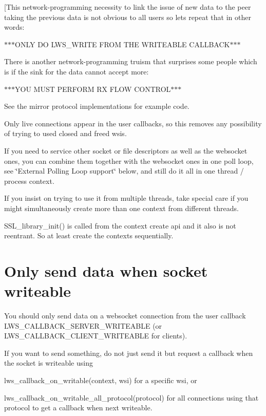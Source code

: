 \mbox{[}This network-\/programming necessity to link the issue of new data to the peer taking the previous data is not obvious to all users so let\textquotesingle{}s repeat that in other words\+:

$\ast$$\ast$$\ast$\+O\+N\+LY DO L\+W\+S\+\_\+\+W\+R\+I\+TE F\+R\+OM T\+HE W\+R\+I\+T\+E\+A\+B\+LE C\+A\+L\+L\+B\+A\+C\+K$\ast$$\ast$$\ast$

There is another network-\/programming truism that surprises some people which is if the sink for the data cannot accept more\+:

$\ast$$\ast$$\ast$\+Y\+OU M\+U\+ST P\+E\+R\+F\+O\+RM RX F\+L\+OW C\+O\+N\+T\+R\+O\+L$\ast$$\ast$$\ast$

See the mirror protocol implementations for example code.

Only live connections appear in the user callbacks, so this removes any possibility of trying to used closed and freed wsis.

If you need to service other socket or file descriptors as well as the websocket ones, you can combine them together with the websocket ones in one poll loop, see \char`\"{}\+External Polling Loop support\char`\"{} below, and still do it all in one thread / process context.

If you insist on trying to use it from multiple threads, take special care if you might simultaneously create more than one context from different threads.

S\+S\+L\+\_\+library\+\_\+init() is called from the context create api and it also is not reentrant. So at least create the contexts sequentially.\hypertarget{md_README.coding_writeable}{}\section{Only send data when socket writeable}\label{md_README.coding_writeable}
You should only send data on a websocket connection from the user callback {\ttfamily L\+W\+S\+\_\+\+C\+A\+L\+L\+B\+A\+C\+K\+\_\+\+S\+E\+R\+V\+E\+R\+\_\+\+W\+R\+I\+T\+E\+A\+B\+LE} (or {\ttfamily L\+W\+S\+\_\+\+C\+A\+L\+L\+B\+A\+C\+K\+\_\+\+C\+L\+I\+E\+N\+T\+\_\+\+W\+R\+I\+T\+E\+A\+B\+LE} for clients).

If you want to send something, do not just send it but request a callback when the socket is writeable using


\begin{DoxyItemize}
\item {\ttfamily lws\+\_\+callback\+\_\+on\+\_\+writable(context, wsi)} for a specific {\ttfamily wsi}, or
\item {\ttfamily lws\+\_\+callback\+\_\+on\+\_\+writable\+\_\+all\+\_\+protocol(protocol)} for all connections using that protocol to get a callback when next writeable.
\end{DoxyItemize}

